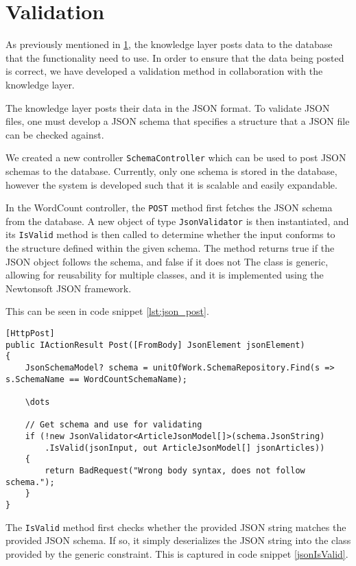 \section{Validation}

As previously mentioned in \ref{}, the knowledge layer posts data to the database that the functionality need to use. 
In order to ensure that the data being posted is correct, we have developed a validation method in collaboration with the knowledge layer.

The knowledge layer posts their data in the JSON format. 
To validate JSON files, one must develop a JSON schema that specifies a structure that a JSON file can be checked against.

We created a new controller \texttt{SchemaController} which can be used to post JSON schemas to the database. 
Currently, only one schema is stored in the database, however the system is developed such that it is scalable and easily expandable.

In the WordCount controller, the \texttt{POST} method first fetches the JSON schema from the database.
A new object of type \texttt{JsonValidator} is then instantiated, and its \texttt{IsValid} method is then called to determine whether the input conforms to the structure defined within the given schema. 
The method returns true if the JSON object follows the schema, and false if it does not
The class is generic, allowing for reusability for multiple classes, and it is implemented using the Newtonsoft JSON framework. 

This can be seen in code snippet \ref{lst:json_post}.

\begin{lstlisting}[language=CSharp, caption={Snippet from the \texttt{POST} method showing validation of the input JSON.}, label={lst:json_post}]
[HttpPost]
public IActionResult Post([FromBody] JsonElement jsonElement)
{
	JsonSchemaModel? schema = unitOfWork.SchemaRepository.Find(s => s.SchemaName == WordCountSchemaName);
	
	\dots

	// Get schema and use for validating
	if (!new JsonValidator<ArticleJsonModel[]>(schema.JsonString)
		.IsValid(jsonInput, out ArticleJsonModel[] jsonArticles))
	{
		return BadRequest("Wrong body syntax, does not follow schema.");
	}
}
\end{lstlisting}

The \texttt{IsValid} method first checks whether the provided JSON string matches the provided JSON schema.
If so, it simply deserializes the JSON string into the class provided by the generic constraint.
This is captured in code snippet \ref{jsonIsValid}.

